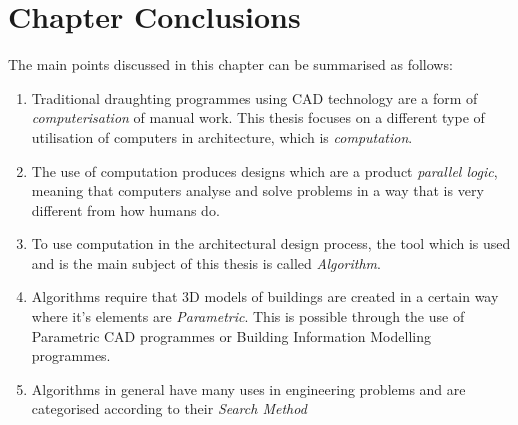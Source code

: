 \clearpage
\section{Chapter Conclusions}

The main points discussed in this chapter can be summarised as follows:
\vspace{-0.3cm}
\begin{enumerate}
	\item Traditional draughting programmes using CAD technology are a form of \emph{computerisation} of manual work. This thesis focuses on a different type of utilisation of computers in architecture, which is \emph{computation}.
	\item The use of computation produces designs which are a product \emph{parallel logic}, meaning that computers analyse and solve problems in a way that is very different from how humans do.
	\item To use computation in the architectural design process, the tool which is used and is the main subject of this thesis is called \emph{Algorithm}.
	\item Algorithms require that 3D models of buildings are created in a certain way where it's elements are \emph{Parametric}. This is possible through the use of Parametric CAD programmes or Building Information Modelling programmes.
	\item Algorithms in general have many uses in engineering problems and are categorised according to their \emph{Search Method}
\end{enumerate}
